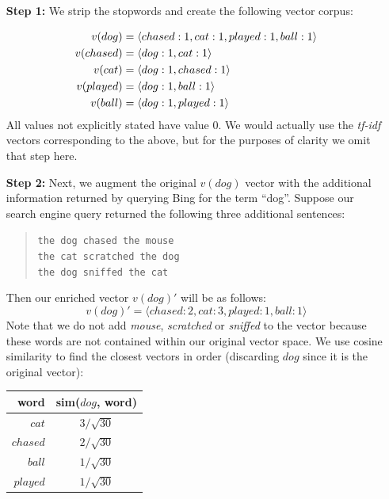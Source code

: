 \documentclass{article}
\begin{document}
\begin{enumerate}

\item[{\bf Step 1:}]
We strip the stopwords and create the following vector corpus:

\begin{align}
    v(dog) &=  \langle chased: 1, cat: 1, played: 1, ball: 1\rangle \notag\\ %
    v(chased)& = \langle dog: 1, cat: 1\rangle \notag\\  %
    v(cat) &=  \langle dog: 1, chased: 1\rangle \notag\\  %
    v(played) &=  \langle dog: 1, ball: 1\rangle \notag\\ %
    v(ball)& =  \langle dog: 1, played: 1\rangle  \notag  %
\end{align}
All values not explicitly stated have value 0.
We would actually use the {\it tf-idf} vectors corresponding to the above, but for the purposes of clarity we omit that step here.

\item[{\bf Step 2:}]
Next, we augment the original $v(dog)$ vector with the additional information returned by querying Bing for the term ``dog''.
Suppose our search engine query returned the following three additional sentences:
\begin{quote}
\texttt{the dog chased the mouse\\ the cat scratched the dog\\ the dog sniffed the cat}
\end{quote}
Then our enriched vector $v(dog)'$ will be as follows:
$$
    v(dog)' = \langle chased: 2, cat: 3, played: 1, ball: 1\rangle %
$$
Note that we do not add {\it mouse}, {\it scratched} or {\it sniffed} to the vector because these words are not contained within our original vector space.
We use cosine similarity to find the closest vectors in order (discarding $dog$ since it is the original vector):

\begin{center}
\begin{tabular}{|r|c|}
\hline
\bf{word} & \bf{sim($dog$, word)}\\
\hline
$cat$ & $3 / \sqrt{30}$\\
$chased$ & $2 / \sqrt{30}$\\
$ball$ & $1 / \sqrt{30}$\\
$played$ & $1 / \sqrt{30}$\\
\hline
\end{tabular}
\end{center}



\end{enumerate}
\end{document}
